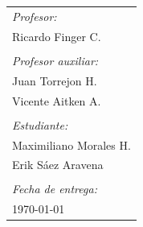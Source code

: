 \documentclass[11pt,a4paper]{article}
\begin{document}
\begin{titlepage}
\begin{minipage}{.5\textwidth}
        \end{minipage}
    
    ~\\[2cm]
    ~ ~ ~
    \begin{minipage}{.8\textwidth}
    \begin{flushright}
    \begin{tabular}{l}
        
        \emph{Profesor:} \\
            {\small Ricardo Finger C.} \\
        \\[0.29cm]

        \emph{Profesor auxiliar:} \\
            {\small Juan Torrejon H.} \\
            {\small Vicente Aitken A.} \\
        \\[0.29cm]
        

        \emph{Estudiante:} \\
            {\small Maximiliano Morales
            H.} \\
            {\small Erik Sáez Aravena}\\
        \\[0.29cm] 
        
        \emph{Fecha de entrega:} \\
            {\small \today}
        \\[0.29cm]  

    \end{tabular}
    \end{flushright}
    \end{minipage}
    
\end{titlepage}

\newpage

\renewcommand{\contentsname}{Índice.}
\tableofcontents{}
\newpage

\renewcommand{\listfigurename}{Lista de figuras.}
\renewcommand{\listtablename}{Lista de tablas.}
\listoffigures
\listoftables
{}

\newpage

\newpage
\end{document}
